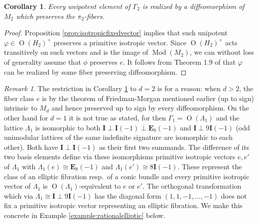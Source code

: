 \documentclass[10pt,letterpaper]{amsart}
\numberwithin{equation}{section}
\def\Eb{\mathbf {E}}
\def\Ib{\mathbf {I}}
\def\G{\Gamma}
\newcommand\Mod{\operatorname{Mod}}
\newcommand\Orth{\operatorname{O}}
\newtheorem{corollary}[theorem]{Corollary}
\theoremstyle{remark}
\newtheorem{remark}[theorem]{Remark}
\begin{document}
\begin{corollary}\label{cor:diffrep}
Every unipotent element of $\G_2$ is realized by a diffeomorphism of $M_2$ which preserves the $\pi_2$-fibers. 
\end{corollary}
\begin{proof}
Proposition \ref{prop:isotropicfixedvector} implies that such unipotent $\varphi\in \Orth(H_2)^+$ preserves a primitive isotropic vector.
Since $\Orth(H_2)^+$  acts transitively on such vectors and is the image of $\Mod(M_2)$, we can without  loss of generality
assume that $\phi$ preserves $e$. It follows from  Theorem 1.9 of \cite{FL2} that $\varphi$ can be realized by some fiber preserving diffeomorphism.
\end{proof}



\begin{remark}\label{rem:diffrep}
The restriction in Corollary \ref{cor:diffrep} to  $d=2$ is for a reason: when $d>2$,  the fiber class $e$ is  by the theorem of Friedman-Morgan  mentioned earlier (up to sign) intrinsic to $M_d$ and hence preserved up to sign by every diffeomorphism. On the other hand  
for $d=1$ it is not true as stated, for then  $\G_1=\Orth(\Lambda_1)$ and the lattice  $\Lambda_1$ is isomorphic to both
$\Ib\perp\Ib(-1)\perp \Eb_8(-1)$ and  $\Ib\perp 9\Ib(-1)$ (odd unimodular lattices of the same indefinite signature are isomorphic to each other).  Both have  $\Ib\perp \Ib(-1)$ as their first two summands. The difference of its  two basis elements define via these isomorphisms  primitive isotropic vectors $e, e'$ of $\Lambda_1$ with  $\Lambda_1(e)\cong \Eb_8(-1)$ and $\Lambda_1(e')\cong 8\Ib(-1)$.
These represent the class of an elliptic fibration resp.\ of a conic bundle and every primitive isotropic vector of $\Lambda_1$
is $\Orth(\Lambda_1)$-equivalent to $e$ or $e'$. The orthogonal transformation which via $\Lambda_1\cong \Ib\perp 9\Ib(-1)$ has the diagonal form $(1,1,-1,\dots, -1)$ does not fix a primitive isotropic vector representing an elliptic fibration.
We make this concrete in Example \ref{example:rationalelliptic} below.
\end{remark}
\end{document}

